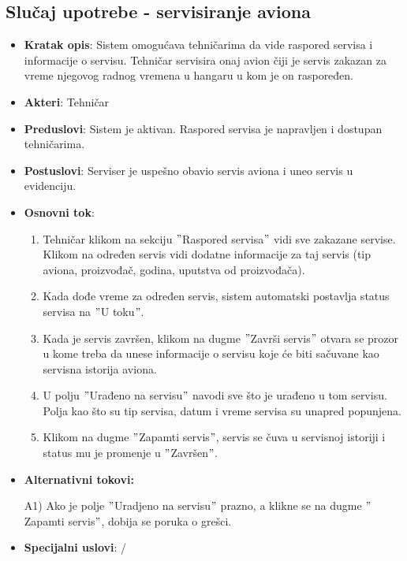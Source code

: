 \documentclass[a4paper]{article}
\begin{document}
\subsection{Slučaj upotrebe - servisiranje aviona}
\label{subsec:servisiranje_aviona}
\begin{itemize}
    \item \textbf{Kratak opis}: Sistem omogućava tehničarima da vide raspored servisa i informacije o servisu. Tehničar servisira onaj avion čiji je servis zakazan za vreme njegovog radnog vremena u hangaru u kom je on raspoređen.
    \item \textbf{Akteri}: Tehničar
    \item \textbf{Preduslovi}: Sistem je aktivan. Raspored servisa je napravljen i dostupan tehničarima.
    \item \textbf{Postuslovi}: Serviser je uspešno obavio servis aviona i uneo servis u evidenciju.
    \item \textbf{Osnovni tok}:
        \begin{enumerate}
            \item Tehničar klikom na sekciju $"$Raspored servisa$"$ vidi sve zakazane servise. Klikom na određen servis vidi dodatne informacije za taj servis (tip aviona, proizvođač, godina, uputstva od proizvođača).
            \item Kada dođe vreme za određen servis, sistem automatski postavlja status servisa na $"$U toku$"$.
            \item Kada je servis završen, klikom na dugme $"$Završi servis$"$ otvara se prozor u kome treba da unese informacije o servisu koje će biti sačuvane kao servisna istorija aviona.
            \item U polju $"$Urađeno na servisu$"$ navodi sve što je urađeno u tom servisu. Polja kao što su tip servisa, datum i vreme servisa su unapred popunjena.
            \item Klikom na dugme $"$Zapamti servis$"$, servis se čuva u servisnoj istoriji i status mu je promenje u $"$Završen$"$.
        \end{enumerate}
    \item \textbf{Alternativni tokovi:}
        \begin{enumerate}
            A1) Ako je polje $"$Uradjeno na servisu$"$ prazno, a klikne se na dugme $"$Zapamti servis$"$, dobija se poruka o grešci.
        \end{enumerate}
    \item \textbf{Specijalni uslovi}: /
\end{itemize}
\end{document}

